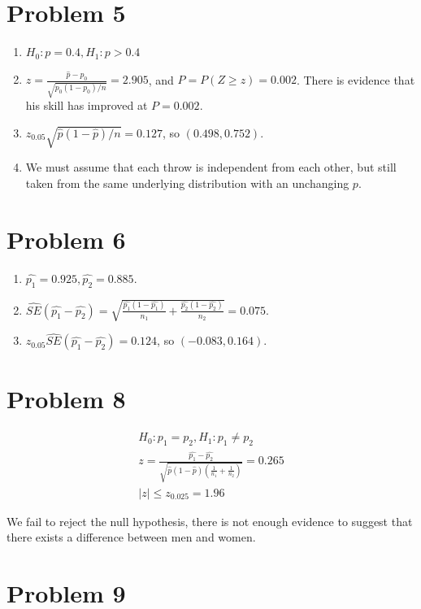 \documentclass{article}
\begin{document}
\section*{Problem 5}

\begin{enumerate}
	\item $H_0: p = 0.4, H_1: p > 0.4$
	\item $z = \frac{\widehat{p}-p_0}{\sqrt{p_0(1-p_0)/n}} = 2.905$, and $P = P(Z \ge z) = 0.002$.
		There is evidence that his skill has improved at $P = 0.002$.
	\item $z_{0.05} \sqrt{\widehat{p}(1-\widehat{p})/n} = 0.127$, so $(0.498, 0.752)$.
	\item We must assume that each throw is independent from each other, but still taken from the same underlying distribution with an unchanging $p$.
\end{enumerate}

\section*{Problem 6}

\begin{enumerate}
	\item $\widehat{p_1} = 0.925, \widehat{p_2} = 0.885$.
	\item $\widehat{SE}(\widehat{p_1}-\widehat{p_2}) = \sqrt{\frac{\widehat{p_1}(1-\widehat{p_1})}{n_1}+\frac{\widehat{p_2}(1-\widehat{p_2})}{n_2}}
		= 0.075$.
	\item $z_{0.05} \widehat{SE}(\widehat{p_1}-\widehat{p_2}) = 0.124$, so $(-0.083, 0.164)$.
\end{enumerate}

\section*{Problem 8}

\begin{gather*}
	H_0: p_1 = p_2, H_1: p_1 \ne p_2 \\
	z = \frac{\widehat{p_1}-\widehat{p_2}}{\sqrt{\widehat{p}(1-\widehat{p})\left(\frac{1}{n_1} + \frac{1}{n_2}\right)}}
	= 0.265 \\
	|z| \le z_{0.025} = 1.96
\end{gather*}

We fail to reject the null hypothesis, there is not enough evidence to suggest
that there exists a difference between men and women.

\section*{Problem 9}
\end{document}
